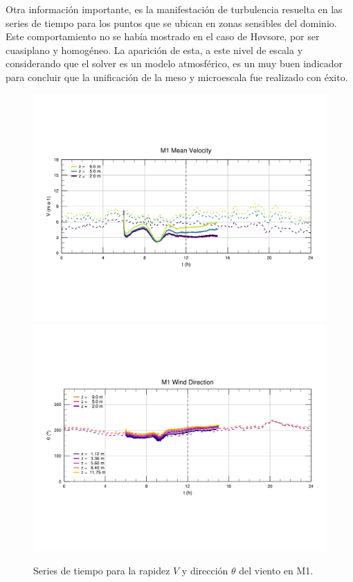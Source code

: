 Otra información importante, es la manifestación de turbulencia resuelta en las series de tiempo para los puntos que se ubican en zonas sensibles del dominio. Este comportamiento no se había mostrado en el caso de Høvsore, por ser cuasiplano y homogéneo. La aparición de esta, a este nivel de escala y considerando que el solver es un modelo atmosférico, es un muy buen indicador para concluir que la unificación de la meso y microescala fue realizado con éxito.

\newpage
\begin{figure}[H]
	\centering
	\includegraphics[width=0.87\linewidth,page=1,trim={9mm 57mm 10mm 60mm},clip]{Imagenes/06/bol/ts_interpol_compare.pdf}\\%
	\includegraphics[width=0.87\linewidth,page=1,trim={12mm 52mm 10mm 60mm},clip]{Imagenes/06/bol/ts_interpol_compare_o.pdf}%
	\vspace{-2mm}\caption{Series de tiempo para la rapidez $V$ y dirección $\theta$ del viento en M1.}
	\label{fig:06_bol_ts_m1}
\end{figure}

